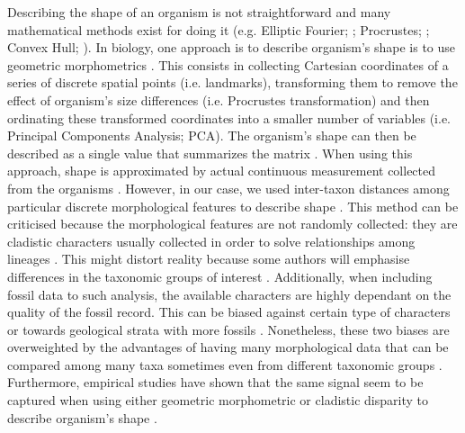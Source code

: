 Describing the shape of an organism is not straightforward and many mathematical methods exist for doing it (e.g. Elliptic Fourier; \citealt{Fourier1982}; Procrustes; \citealt{JamesRohlf1993129}; Convex Hull; \citealt{ANDREW1979216}).
In biology, one approach is to describe organism's shape is to use geometric morphometrics \citep{zelditch2012geometric}.
This consists in collecting Cartesian coordinates of a series of discrete spatial points (i.e. landmarks), transforming them to remove the effect of organism's size differences (i.e. Procrustes transformation) and then ordinating these transformed coordinates into a smaller number of variables (i.e. Principal Components Analysis; PCA).
The organism's shape can then be described as a single value that summarizes the matrix \citep[e.g. the sum of the ranges of each PCA axis;][]{zelditch2012geometric}. 
When using this approach, shape is approximated by actual continuous measurement collected from the organisms \citep[e.g.][]{friedmanexplosive2010,hopkinsdecoupling2013,finlay2015morphological}.  %
However, in our case, we used inter-taxon distances among particular discrete morphological features to describe shape \citep[i.e. the cladistic disparity method; e.g.][]{foote1997evolution,Wills2001,Wesley-Hunt2005}.
This method can be criticised because the morphological features are not randomly collected: they are cladistic characters usually collected in order to solve relationships among lineages \citep{O'Leary08022013}.
This might distort reality because some authors will emphasise differences in the taxonomic groups of interest \citep{Hopkins24032015}.
Additionally, when including fossil data to such analysis, the available characters are highly dependant on the quality of the fossil record.
This can be biased against certain type of characters \citep[e.g. soft tissue ones;][]{sansomfossilization2013} or towards geological strata with more fossils \citep[e.g. \textit{Lagerst\"{a}tten};][]{Butler2012}.
Nonetheless, these two biases are overweighted by the advantages of having many morphological data \citep[some morphological matrices have more than 1000 morphological characters; e.g.][]{O'Leary08022013,ni2013oldest} that can be compared among many taxa sometimes even from different taxonomic groups \citep[e.g. among all mammals;][]{O'Leary08022013,Slater2012MEE,beckancient2014}.
Furthermore, empirical studies have shown that the same signal seem to be captured when using either geometric morphometric or cladistic disparity to describe organism's shape \citep{foth2012different,hetherington2015cladistic}. 

